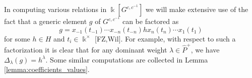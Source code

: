 \documentclass[12pt]{amsart}
\newcommand{\saySS}[1]{\say[SS]{\color{blue}{\bf SS:}\;#1}}
\newcommand{\kk}{\Bbbk}%
\newtheorem{proposition}[theorem]{Proposition}
\theoremstyle{remark}
\numberwithin{equation}{section}
\begin{document}
In computing various relations in $\kk[G^{c,c^{-1}}]$ we will make extensive use of the fact that a generic element $g$ of $G^{c,c^{-1}}$ can be factored as
\begin{equation}
  \label{eq:generic_element}
  g=x_{-1}(t_{-1}) \cdots x_{-n}(t_{-n}) h x_n(t_n) \cdots x_1(t_1)
\end{equation}
for some $h \in H$ and $t_i \in \kk^\times$ [FZ,Wil]. 
For example, with respect to such a factorization it is clear that for any dominant weight $\lambda \in \widehat{P}^+$, we have $\Delta_\lambda(g) = h^\lambda$. Some similar computations are collected in Lemma \ref{lemma:coefficients_values}. 


\end{document}
